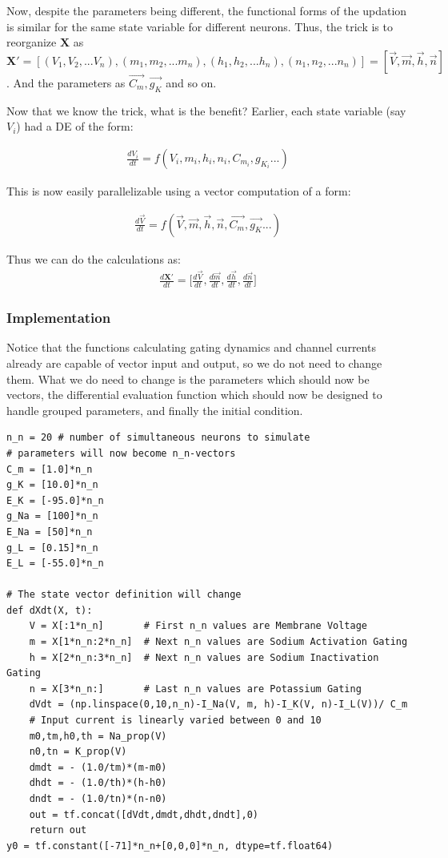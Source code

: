 \documentclass[10pt,letterpaper]{article}
\begin{document}
Now, despite the parameters being different, the functional forms of the updation is similar for the same state variable for different neurons. Thus, the trick is to reorganize $\mathbf{X}$ as $\mathbf{X'}=[(V_1,V_2,...V_n),(m_1,m_2,...m_n),(h_1,h_2,...h_n),(n_1,n_2,...n_n)]=[\vec{V},\vec{m},\vec{h},\vec{n}]$. And the parameters as $\vec{C_m},\vec{g_K}$ and so on.

Now that we know the trick, what is the benefit? Earlier, each state variable (say $V_i$) had a DE of the form:

\begin{eqnarray}\frac{dV_i}{dt}=f(V_i,m_i,h_i,n_i,C_{m_i},g_{K_i}...)\end{eqnarray}

This is now easily parallelizable using a vector computation of a form: 

\begin{eqnarray}\frac{d\vec{V}}{dt}=f(\vec{V},\vec{m},\vec{h},\vec{n},\vec{C_m},\vec{g_K}...)\end{eqnarray}

Thus we can do the calculations as:
\begin{eqnarray}\frac{d\mathbf{X'}}{dt}= \Big[\frac{d\vec{V}}{dt},\frac{d\vec{m}}{dt},\frac{d\vec{h}}{dt},\frac{d\vec{n}}{dt}\Big]\end{eqnarray}

\subsubsection*{Implementation}

Notice that the functions calculating gating dynamics and channel currents already are capable of vector input and output, so we do not need to change them. What we do need to change is the parameters which should now be vectors, the differential evaluation  function which should now be designed to handle grouped parameters, and finally the initial condition.

\begin{verbatim}
n_n = 20 # number of simultaneous neurons to simulate
# parameters will now become n_n-vectors
C_m = [1.0]*n_n
g_K = [10.0]*n_n
E_K = [-95.0]*n_n
g_Na = [100]*n_n
E_Na = [50]*n_n 
g_L = [0.15]*n_n
E_L = [-55.0]*n_n

# The state vector definition will change
def dXdt(X, t):
    V = X[:1*n_n]       # First n_n values are Membrane Voltage
    m = X[1*n_n:2*n_n]  # Next n_n values are Sodium Activation Gating
    h = X[2*n_n:3*n_n]  # Next n_n values are Sodium Inactivation Gating
    n = X[3*n_n:]       # Last n_n values are Potassium Gating
    dVdt = (np.linspace(0,10,n_n)-I_Na(V, m, h)-I_K(V, n)-I_L(V))/ C_m 
    # Input current is linearly varied between 0 and 10
    m0,tm,h0,th = Na_prop(V)
    n0,tn = K_prop(V)
    dmdt = - (1.0/tm)*(m-m0)
    dhdt = - (1.0/th)*(h-h0)
    dndt = - (1.0/tn)*(n-n0)
    out = tf.concat([dVdt,dmdt,dhdt,dndt],0)
    return out
y0 = tf.constant([-71]*n_n+[0,0,0]*n_n, dtype=tf.float64)
\end{verbatim}
\end{document}
